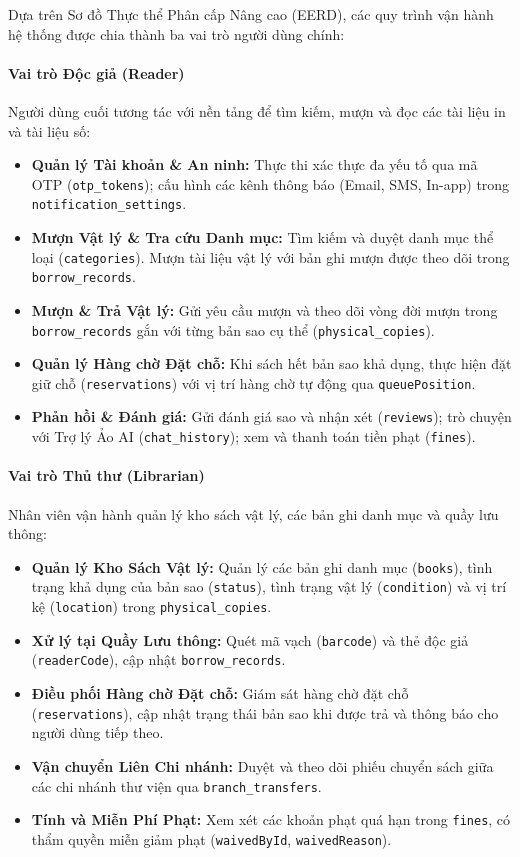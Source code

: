 Dựa trên Sơ đồ Thực thể Phân cấp Nâng cao (EERD), các quy trình vận hành hệ thống được chia thành ba vai trò người dùng chính:

\paragraph{Vai trò Độc giả (Reader)}
Người dùng cuối tương tác với nền tảng để tìm kiếm, mượn và đọc các tài liệu in và tài liệu số:
\begin{itemize}
	\item \textbf{Quản lý Tài khoản \& An ninh:} Thực thi xác thực đa yếu tố qua mã OTP (\texttt{otp\_tokens}); cấu hình các kênh thông báo (Email, SMS, In-app) trong \texttt{notification\_settings}.
	\item \textbf{Mượn Vật lý \& Tra cứu Danh mục:} Tìm kiếm và duyệt danh mục thể loại (\texttt{categories}). Mượn tài liệu vật lý với bản ghi mượn được theo dõi trong \texttt{borrow\_records}.
	\item \textbf{Mượn \& Trả Vật lý:} Gửi yêu cầu mượn và theo dõi vòng đời mượn trong \texttt{borrow\_records} gắn với từng bản sao cụ thể (\texttt{physical\_copies}).
	\item \textbf{Quản lý Hàng chờ Đặt chỗ:} Khi sách hết bản sao khả dụng, thực hiện đặt giữ chỗ (\texttt{reservations}) với vị trí hàng chờ tự động qua \texttt{queuePosition}.
	\item \textbf{Phản hồi \& Đánh giá:} Gửi đánh giá sao và nhận xét (\texttt{reviews}); trò chuyện với Trợ lý Ảo AI (\texttt{chat\_history}); xem và thanh toán tiền phạt (\texttt{fines}).
\end{itemize}

\paragraph{Vai trò Thủ thư (Librarian)}
Nhân viên vận hành quản lý kho sách vật lý, các bản ghi danh mục và quầy lưu thông:
\begin{itemize}
	\item \textbf{Quản lý Kho Sách Vật lý:} Quản lý các bản ghi danh mục (\texttt{books}), tình trạng khả dụng của bản sao (\texttt{status}), tình trạng vật lý (\texttt{condition}) và vị trí kệ (\texttt{location}) trong \texttt{physical\_copies}.
	\item \textbf{Xử lý tại Quầy Lưu thông:} Quét mã vạch (\texttt{barcode}) và thẻ độc giả (\texttt{readerCode}), cập nhật \texttt{borrow\_records}.
	\item \textbf{Điều phối Hàng chờ Đặt chỗ:} Giám sát hàng chờ đặt chỗ (\texttt{reservations}), cập nhật trạng thái bản sao khi được trả và thông báo cho người dùng tiếp theo.
	\item \textbf{Vận chuyển Liên Chi nhánh:} Duyệt và theo dõi phiếu chuyển sách giữa các chi nhánh thư viện qua \texttt{branch\_transfers}.
	\item \textbf{Tính và Miễn Phí Phạt:} Xem xét các khoản phạt quá hạn trong \texttt{fines}, có thẩm quyền miễn giảm phạt (\texttt{waivedById}, \texttt{waivedReason}).
\end{itemize}

